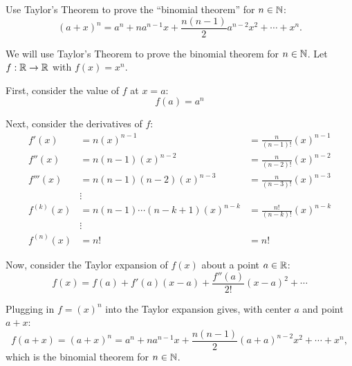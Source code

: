 \begin{problem}
  Use Taylor's Theorem to prove the ``binomial theorem'' for $n \in \mathbb{N}$:
  \[ (a + x)^n = a^n + na^{n-1}x + \frac{n(n-1)}{2}a^{n-2}x^2 + \cdots + x^n. \]
\end{problem}

\begin{answer}
  We will use Taylor's Theorem to prove the binomial theorem for $n \in \mathbb{N}$.
  Let $f : \mathbb{R} \to \mathbb{R}$ with $f(x) = x^n$.

  \begin{enumarabic}
    \item First, consider the value of $f$ at $x = a$:
      \[ f(a) = a^n \]
    \item Next, consider the derivatives of $f$:
      \begin{align*}
        f'(x) &= n(x)^{n-1} &= \frac{n}{(n-1)!} (x)^{n-1} \\
        f''(x) &= n(n-1)(x)^{n-2} &= \frac{n}{(n-2)!} (x)^{n-2} \\
        f'''(x) &= n(n-1)(n-2)(x)^{n-3} &= \frac{n}{(n-3)!} (x)^{n-3} \\
        &\vdots \\
        f^{(k)}(x) &= n(n-1)\cdots(n-k+1)(x)^{n-k} &= \frac{n!}{(n-k)!} (x)^{n-k} \\
        &\vdots \\
        f^{(n)}(x) &= n! &= n!
      \end{align*}
    \item Now, consider the Taylor expansion of $f(x)$ about a point $a \in \mathbb{R}$:
      \[ f(x) = f(a) + f'(a)(x - a) + \frac{f''(a)}{2!}(x - a)^2 + \cdots \]
    
    \item Plugging in $f = (x)^n$ into the Taylor expansion gives,
      with center $a$ and point $a + x$:
      \[
        f(a+x) = (a+x)^n = a^n + na^{n-1}x + \frac{n(n-1)}{2}(a + a)^{n-2}x^2
              + \cdots + x^n,
      \]
      which is the binomial theorem for $n \in \mathbb{N}$.
  \end{enumarabic}
\end{answer}
